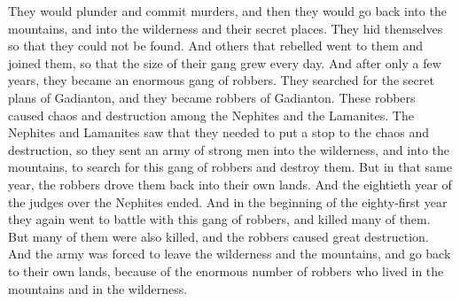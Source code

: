 They would plunder and commit murders, and then they would go back into the mountains, and into the wilderness and their secret places. They hid themselves so that they could not be found. And others that rebelled went to them and joined them, so that the size of their gang grew every day.
\bverse \iffalse And thus in time, yea, even in the space of not many years, they became an exceedingly great band of robbers; and they did search out all the secret plans of Gadianton; and thus they became robbers of Gadianton. \fi
And after only a few years, they became an enormous gang of robbers. They searched for the secret plans of Gadianton, and they became robbers of Gadianton.
\bverse \iffalse Now behold, these robbers did make great havoc, yea, even great destruction among the people of Nephi, and also among the people of the Lamanites. \fi
These robbers caused chaos and destruction among the Nephites and the Lamanites.
\bverse \iffalse And it came to pass that it was expedient that there should be a stop put to this work of destruction; therefore they sent an army of strong men into the wilderness and upon the mountains to search out this band of robbers, and to destroy them. \fi
The Nephites and Lamanites saw that they needed to put a stop to the chaos and destruction, so they sent an army of strong men into the wilderness, and into the mountains, to search for this gang of robbers and destroy them.
\bverse \iffalse But behold, it came to pass that in that same year they were driven back even into their own lands. And thus ended the eightieth year of the reign of the judges over the people of Nephi. \fi
But in that same year, the robbers drove them back into their own lands. And the eightieth year of the judges over the Nephites ended.
\bverse \iffalse And it came to pass in the commencement of the eighty and first year they did go forth again against this band of robbers, and did destroy many; and they were also visited with much destruction. \fi
And in the beginning of the eighty-first year they again went to battle with this gang of robbers, and killed many of them. But many of them were also killed, and the robbers caused great destruction.
\bverse \iffalse And they were again obliged to return out of the wilderness and out of the mountains unto their own lands, because of the exceeding greatness of the numbers of those robbers who infested the mountains and the wilderness. \fi
And the army was forced to leave the wilderness and the mountains, and go back to their own lands, because of the enormous number of robbers who lived in the mountains and in the wilderness.
